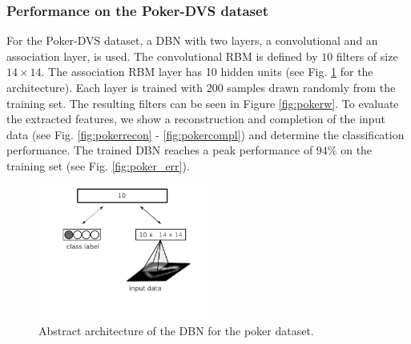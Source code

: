 \clearpage

\subsubsection{Performance on the Poker-DVS dataset} \label{c:pokerexp}

For the Poker-DVS dataset, a DBN with two layers, a convolutional and an association layer, is used.
The convolutional RBM is defined by $10$ filters of size $14 \times 14$.
The association RBM layer has 10 hidden units (see Fig. \ref{fig:pokerdbnarch} for the architecture).
Each layer is trained with $200$ samples drawn randomly from the training set.
The resulting filters can be seen in Figure \ref{fig:pokerw}.
To evaluate the extracted features, we show a reconstruction and completion of the input data (see Fig. \ref{fig:pokerrecon} - \ref{fig:pokercompl}) and determine the classification performance. 
The trained DBN reaches a peak performance of $94 \%$ on the training set (see Fig. \ref{fig:poker_err}).


\begin{figure}[h!]
	\centering
    	\includegraphics[width=0.5\textwidth]{imgs/poker/dbn_poker1.png} 
    \caption{Abstract architecture of the DBN for the poker dataset.}
	\label{fig:pokerdbnarch}
\end{figure}



